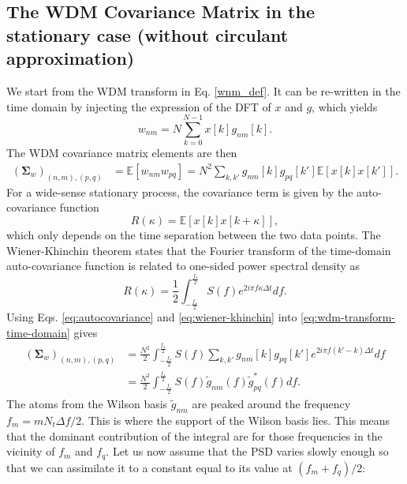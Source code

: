 \subsection{The WDM Covariance Matrix in the stationary case (without circulant approximation)}

We start from the WDM transform in Eq. \eqref{wnm_def}. It can be re-written in the time domain by injecting the expression of the DFT of $x$ and $g$, which yields
\begin{equation}
\label{eq:wdm-transform-time-domain}
    w_{nm} = N \sum_{k=0}^{N-1} x[k] g_{nm}[k].
\end{equation}
The WDM covariance matrix elements are then
\begin{align}
(\boldsymbol{\Sigma}_w)_{(n,m),(p,q)} &= \mathbb{E}[w_{nm}w_{pq}] = N^2 \sum_{k,k'}g_{nm}[k]g_{pq}[k']\mathbb{E}[x[k]x[k']].
\end{align}
For a wide-sense stationary process, the covariance term is given by the auto-covariance function
\begin{equation}
\label{eq:autocovariance}
R(\kappa) = \mathbb{E}[x[k]x[k+\kappa]],
\end{equation}
which only depends on the time separation between the two data points.
The Wiener-Khinchin theorem states that the Fourier transform of the
time-domain auto-covariance function is related to one-sided power spectral density as
\begin{equation}
\label{eq:wiener-khinchin}
    R(\kappa) = \frac{1}{2}\int_{-\frac{f_s}{2}}^{\frac{f_s}{2}} S(f) e^{2 i \pi f \kappa \Delta t } df.
\end{equation}
Using Eqs. \eqref{eq:autocovariance} and \eqref{eq:wiener-khinchin} into \eqref{eq:wdm-transform-time-domain} gives
\begin{align}
(\boldsymbol{\Sigma}_w)_{(n,m),(p,q)} &=  \frac{N^2}{2}\int_{-\frac{f_s}{2}}^{\frac{f_s}{2}} S(f)  \sum_{k,k'}g_{nm}[k]g_{pq}[k'] e^{2 i \pi f (k'-k) \Delta t } df \\
& = \frac{N^2}{2}\int_{-\frac{f_s}{2}}^{\frac{f_s}{2}} S(f) \tilde{g}_{nm}(f) \tilde{g}_{pq}^{*}(f) df.
\end{align}
 The atoms from the Wilson basis $\tilde{g}_{nm}$ are peaked around the frequency $f_m = m N_t \Delta f/2$. This is where the support of the Wilson basis lies. This means that the dominant contribution of the integral are for those frequencies in the vicinity of $f_m$ and $f_q$. Let us now assume that the PSD varies slowly enough so that we can assimilate it to a constant equal to its value at $(f_m + f_q) / 2$:
